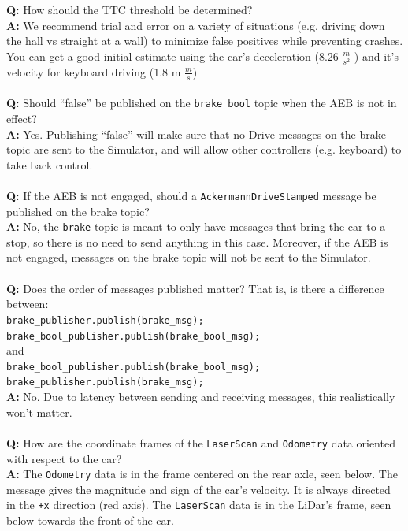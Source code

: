 \documentclass[letta4 paper]{article}
\numberwithin{equation}{section}
\newcommand{\0}{\mathbf{0}}
\begin{document}
	\textbf{Q:} How should the TTC threshold be determined? \\
	\textbf{A:} We recommend trial and error on a variety of situations (e.g. driving down the hall vs straight at a wall) to minimize false positives while preventing crashes. You can get a good initial estimate using the car’s deceleration (8.26 \(\frac{m}{s^2}\) ) and it’s velocity for keyboard driving (1.8 m \(\frac{m}{s}\))
	\\
	\\
	\textbf{Q:} Should “false” be published on the \texttt{brake bool} topic when the AEB is not in effect?\\
	\textbf{A:} Yes. Publishing “false” will make sure that no Drive messages on the brake topic are sent to the Simulator, and will allow other controllers (e.g. keyboard) to take back control.
	\\
	\\
	\textbf{Q:} If the AEB is not engaged, should a \texttt{AckermannDriveStamped} message be published on the brake topic?\\
	\textbf{A:} No, the \texttt{brake} topic is meant to only have messages that bring the car to a stop, so there is no need to send anything in this case. Moreover, if the AEB is not engaged, messages on the brake topic will not be sent to the Simulator.
	\\
	\\
	\textbf{Q:} Does the order of messages published matter? That is, is there a difference between:\\ \texttt{brake\_publisher.publish(brake\_msg);}\\
	\texttt{brake\_bool\_publisher.publish(brake\_bool\_msg);}\\
	and\\
	\texttt{brake\_bool\_publisher.publish(brake\_bool\_msg);}\\
	\texttt{brake\_publisher.publish(brake\_msg);}\\
	\textbf{A:} No. Due to latency between sending and receiving messages, this realistically won’t matter.
	\\
	\\
	\textbf{Q:} How are the coordinate frames of the \texttt{LaserScan} and \texttt{Odometry} data oriented with respect to the car?\\
	\textbf{A:} The \texttt{Odometry} data is in the frame centered on the rear axle, seen below. The message gives the magnitude and sign of the car’s velocity. It is always directed in the \texttt{+x} direction (red axis). The \texttt{LaserScan} data is in the LiDar’s frame, seen below towards the front of the car.
\end{document}
